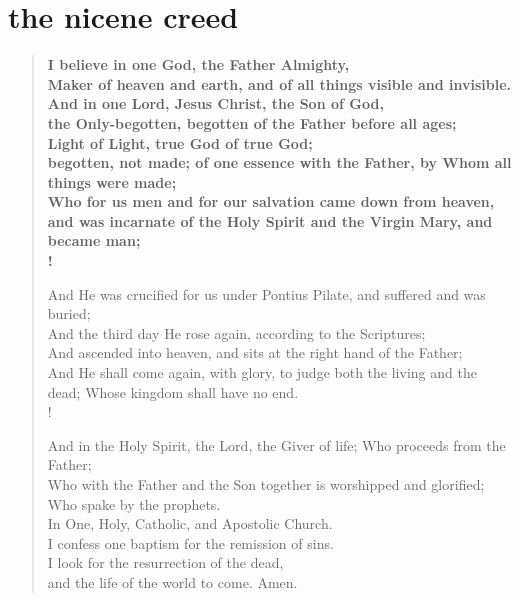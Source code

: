 \section{the nicene creed}

\begin{verse}
    \bfseries I believe in one God, the Father Almighty, \\
    Maker of heaven and earth, and of all things visible and invisible. \\
    And in one Lord, Jesus Christ, the Son of God, \\
    the Only-begotten, begotten of the Father before all ages; \\
    Light of Light, true God of true God; \\
    begotten, not made; of one essence with the Father, by Whom all things were made; \\
    Who for us men and for our salvation came down from heaven, \\
    and was incarnate of the Holy Spirit and the Virgin Mary, \verselinebreak and became man; \\!

    And He was crucified for us under Pontius Pilate, and suffered \verselinebreak and was buried; \\
    And the third day He rose again, according to the Scriptures; \\
    And ascended into heaven, and sits at the right hand of the Father; \\
    And He shall come again, with glory, to judge both the living and the dead; Whose kingdom shall have no end. \\!

    And in the Holy Spirit, the Lord, the Giver of life; Who proceeds from the Father; \\
    Who with the Father and the Son together is worshipped and glorified; Who spake by the prophets. \\
    In One, Holy, Catholic, and Apostolic Church. \\
    I confess one baptism for the remission of sins. \\
    I look for the resurrection of the dead, \\
    and the life of the world to come. Amen.
\end{verse}
